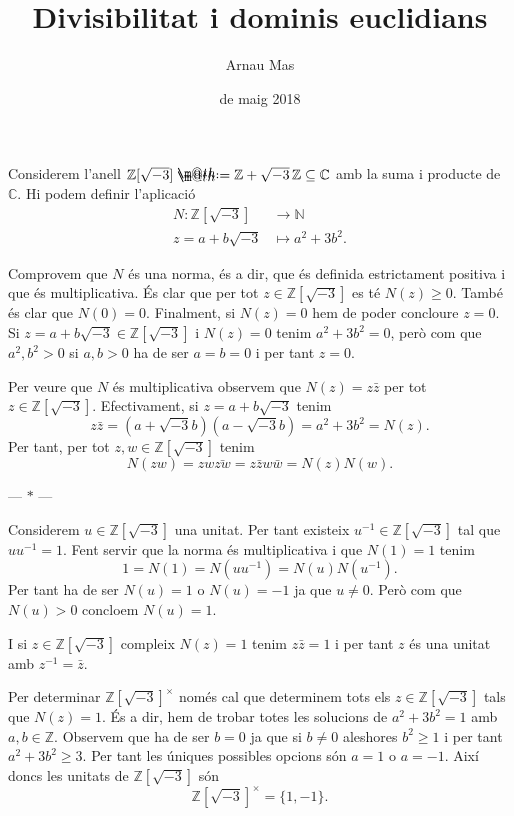 \documentclass[12pt]{article}
\title{\sffamily {\bfseries Entrega 2:} Divisibilitat i dominis euclidians}
\author{\sffamily Arnau Mas}
\date{\sffamily 18 de maig 2018}
\makeatletter
\newcommand{\Z}{\mathbb{Z}}
\newcommand{\R}{\Z[\sqrt{-3}]}
\newcommand{\N}{\mathbb{N}}
\newcommand{\C}{\mathbb{C}}
\newcommand{\unit}[1]{#1^{\times}}
\newcommand{\parbreak}{
	\begin{center}
		--- $\ast$ ---
	\end{center} 
}
\newcommand*{\defeq}{\mathrel{\rlap{%
    \raisebox{0.3ex}{$\m@th\cdot$}}%
  \raisebox{-0.3ex}{$\m@th\cdot$}}%
	=
}
\makeatother
\begin{document}
\maketitle

Considerem l'anell \( \R \defeq \Z + \sqrt{-3}\,\Z \subseteq \C \) amb la suma i producte de \( \C \). Hi podem definir l'aplicació
\begin{align*}
	N \colon \R & \longrightarrow \N \\
	z = a + b\sqrt{-3} & \longmapsto a^2 + 3b^2.
\end{align*}

Comprovem que \( N \) és una norma, és a dir, que és definida estrictament positiva i que és multiplicativa. És clar que per tot \( z \in \R \) es té \( N(z) \geq 0 \). També és clar que \( N(0) = 0 \). Finalment, si \( N(z) = 0 \) hem de poder concloure \( z = 0 \). Si \( z = a + b \sqrt{-3} \in \R \) i \( N(z) = 0 \) tenim \( a^2 + 3b^2 = 0 \), però com que \( a^2, b^2 > 0 \) si \( a,b > 0 \) ha de ser \( a = b = 0 \) i per tant \( z = 0 \).

Per veure que \( N \) és multiplicativa observem que \( N(z) = z\bar{z} \) per tot \( z \in \R \). Efectivament, si \( z = a+b\sqrt{-3} \) tenim
\begin{equation*}
	z\bar{z} = (a + \sqrt{-3}b)(a - \sqrt{-3}b) = a^2 + 3b^2 = N(z).
\end{equation*}
Per tant, per tot \( z, w \in \R \) tenim
\begin{equation*}
	N(zw) = zw \bar{zw} = z\bar{z} w\bar{w} = N(z) N(w).
\end{equation*}

\parbreak

Considerem \( u \in \R \) una unitat. Per tant existeix \( u^{-1} \in \R \) tal que \( uu^{-1} = 1 \). Fent servir que la norma és multiplicativa i que \( N(1) = 1 \) tenim
\begin{equation*}
	1 = N(1) = N(uu^{-1}) = N(u) N(u^{-1}).
\end{equation*}
Per tant ha de ser \( N(u) = 1 \) o \( N(u) = -1 \) ja que \( u \neq 0 \). Però com que \( N(u) > 0 \) concloem \( N(u) = 1 \).  

I si \( z \in \R \) compleix \( N(z) = 1 \) tenim \( z\bar{z} = 1 \) i per tant \( z \) és una unitat amb \( z^{-1} = \bar{z} \).

Per determinar \( \unit{\R} \) només cal que determinem tots els \( z \in \R \) tals que \( N(z) = 1 \). És a dir, hem de trobar totes les solucions de \( a^2 + 3b^2 = 1 \) amb \( a, b \in \Z \). Observem que ha de ser \( b = 0 \) ja que si \( b \neq 0 \) aleshores \( b^2 \geq 1 \) i per tant \( a^2 + 3b^2 \geq 3 \). Per tant les úniques possibles opcions són \( a = 1 \) o \( a = -1 \). Així doncs les unitats de \( \R \) són
\begin{equation*}
	\unit{\R} = \{1, -1\}.
\end{equation*}
\end{document}
